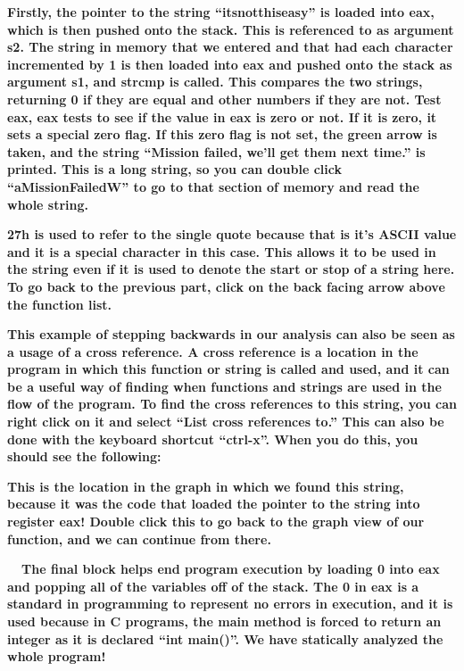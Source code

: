 \documentclass[letterpaper]{article}
\newcommand{\sitfig}[3]{
\begin{figure}[H]
\centering
\makebox[\textwidth][c]{
#2
}
\label{#1}
\end{figure}
}
\newcommand{\sitgfx}[4][scale=1.0]{
\sitfig{#3}{\texttt{[image: \#2]}}{#4}
}
\begin{document}
  
\sitgfx[width=6.4898in,height=3.948in]{reversing-img049.png}{fig:unk}{TODO CAPTION}
 \textbf{Firstly, the pointer to the string ``itsnotthiseasy'' is loaded into eax, which is then pushed onto the stack.
This is referenced to as argument s2. The string in memory that we entered and that had each character incremented by 1
is then loaded into eax and pushed onto the stack as argument s1, and strcmp is called. This compares the two strings,
returning 0 if they are equal and other numbers if they are not. Test eax, eax tests to see if the value in eax is zero
or not. If it is zero, it sets a special zero flag. If this zero flag is not set, the green arrow is taken, and the
string ``Mission failed, we'll get them next time.'' is printed. This is a long string, so you can double click
``aMissionFailedW'' to go to that section of memory and read the whole string.}  
\sitgfx[width=6.5in,height=0.6563in]{reversing-img050.png}{fig:unk}{TODO CAPTION}
 \textbf{27h is used to refer to the single quote because that is it's ASCII value and it is a special character in this
case. This allows it to be used in the string even if it is used to denote the start or stop of a string here. To go
back to the previous part, click on the back facing arrow above the function list.}

  
\sitgfx[width=4.1252in,height=2.1772in]{reversing-img051.png}{fig:unk}{TODO CAPTION}
 \textbf{\newline
This example of stepping backwards in our analysis can also be seen as a usage of a cross reference. A cross reference
is a location in the program in which this function or string is called and used, and it can be a useful way of finding
when functions and strings are used in the flow of the program. To find the cross references to this string, you can
right click on it and select ``List cross references to.'' This can also be done with the keyboard shortcut ``ctrl-x''.
When you do this, you should see the following:}

  
\sitgfx[width=6.4898in,height=1.6043in]{reversing-img052.png}{fig:unk}{TODO CAPTION}
 

\textbf{This is the location in the graph in which we found this string, because it was the code that loaded the pointer
to the string into register eax! Double click this to go back to the graph view of our function, and we can continue
from there.}

\textbf{ \ \ The final block helps end program execution by loading 0 into eax and popping all of the variables off of
the stack. The 0 in eax is a standard in programming to represent no errors in execution, and it is used because in C
programs, the main method is forced to return an integer as it is declared ``int main()''. We have statically analyzed
the whole program!}
\end{document}
